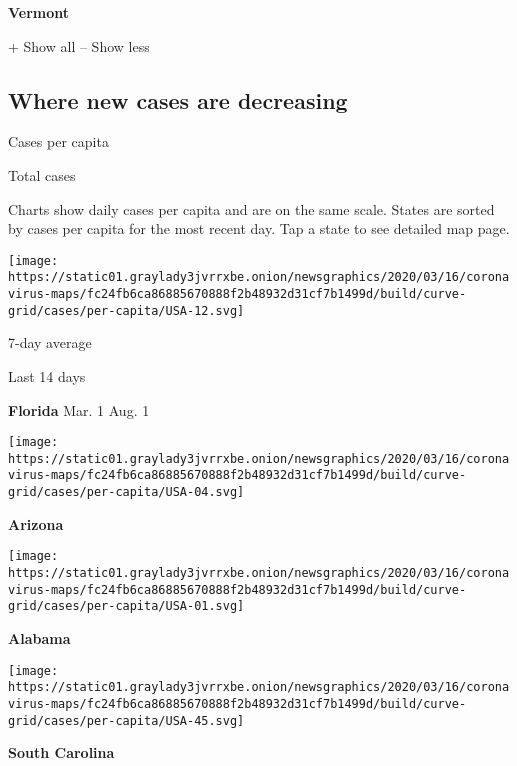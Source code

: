 \textbf{Vermont}

+ Show all -- Show less

\hypertarget{where-new-cases-are-decreasing}{%
\subsection{Where new cases are
decreasing}\label{where-new-cases-are-decreasing}}

Cases per capita

Total cases

Charts show daily cases per capita and are on the same scale. States are
sorted by cases per capita for the most recent day. Tap a state to see
detailed map page.

\href{https://www.nytimes3xbfgragh.onion/interactive/2020/us/florida-coronavirus-cases.html}{}

\texttt{[image: https://static01.graylady3jvrrxbe.onion/newsgraphics/2020/03/16/coronavirus-maps/fc24fb6ca86885670888f2b48932d31cf7b1499d/build/curve-grid/cases/per-capita/USA-12.svg]}

7-day average

Last 14 days

\textbf{Florida} Mar. 1 Aug. 1

\href{https://www.nytimes3xbfgragh.onion/interactive/2020/us/arizona-coronavirus-cases.html}{}

\texttt{[image: https://static01.graylady3jvrrxbe.onion/newsgraphics/2020/03/16/coronavirus-maps/fc24fb6ca86885670888f2b48932d31cf7b1499d/build/curve-grid/cases/per-capita/USA-04.svg]}

\textbf{Arizona}

\href{https://www.nytimes3xbfgragh.onion/interactive/2020/us/alabama-coronavirus-cases.html}{}

\texttt{[image: https://static01.graylady3jvrrxbe.onion/newsgraphics/2020/03/16/coronavirus-maps/fc24fb6ca86885670888f2b48932d31cf7b1499d/build/curve-grid/cases/per-capita/USA-01.svg]}

\textbf{Alabama}

\href{https://www.nytimes3xbfgragh.onion/interactive/2020/us/south-carolina-coronavirus-cases.html}{}

\texttt{[image: https://static01.graylady3jvrrxbe.onion/newsgraphics/2020/03/16/coronavirus-maps/fc24fb6ca86885670888f2b48932d31cf7b1499d/build/curve-grid/cases/per-capita/USA-45.svg]}

\textbf{South Carolina}

\href{https://www.nytimes3xbfgragh.onion/interactive/2020/us/texas-coronavirus-cases.html}{}

